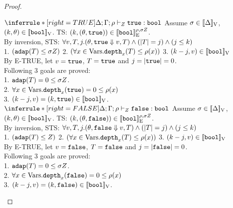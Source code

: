 \documentclass[a4paper,11pt]{article}
\theoremstyle{definition}
\begin{document}
\begin{proof}
\begin{mainitem}
\caseL
{
$
    \inferrule*[right = TRUE]{
    }{
      \Delta; \Gamma; \dmap \tvdash{\nnatA} \etrue: \tbool
    }
$
}
Assume $ \sigma \in [\![ \Delta ]\!]_{\text{V}}$, $ (k, \theta) \in [\![ \mathtt{bool} ]\!]_{\text{V}} $. TS: $(k, (\theta, \mathtt{true})) \in [\![ \mathtt{bool} ]\!]_{\text{E}}^{\rho, \sigma Z}$.\\
%
By inversion, STS: $\forall v, T, j. (\theta, \mathtt{true} \mathrel{\Downarrow} v, T) \land (|T| = j) \land (j \leq k) $\\
%
1. $ (\mathtt{adap}(T) \leq \sigma Z)$
%
2. $ (\forall x \in \mbox{Vars}. \mathtt{depth}_{x}(T) \leq \rho(x))$
%
3. $ (k - j, v) \in [\![ \mathtt{bool} ]\!]_{\text{V}}$\\
%
By E-TRUE, let $v = \mathtt{true}$, $T = \mathtt{true}$ and $j = |\mathtt{true}| = 0$.\\
%
Following 3 goals are proved:\\
%
1. $\mathtt{adap}(T) = 0 \leq \sigma Z$.\\
2. $\forall x \in \mbox{Vars}. \mathtt{depth}_{x}(\mathtt{true}) = 0 \leq \rho(x)$\\
3. $(k - j, v) = (k, \mathtt{true}) \in [\![ \mathtt{bool} ]\!]_{\text{V}}$.\\



\caseL
{
$
    \inferrule*[right = FALSE]{
    }{
      \Delta; \Gamma; \dmap \tvdash{\nnatA} \efalse: \tbool
    }
$
}
Assume $ \sigma \in [\![ \Delta ]\!]_{\text{V}}$, $ (k, \theta) \in [\![ \mathtt{bool} ]\!]_{\text{V}} $. TS: $(k, (\theta, \mathtt{false})) \in [\![ \mathtt{bool} ]\!]_{\text{E}}^{\rho, \sigma Z}$.\\
%
By inversion, STS: $\forall v, T, j. (\theta, \mathtt{false} \mathrel{\Downarrow} v, T) \land (|T| = j) \land (j \leq k) $\\
%
1. $ (\mathtt{adap}(T) \leq Z) $
%
2. $ (\forall x \in  \mbox{Vars}. \mathtt{depth}_{x}(T) \leq \rho(x))$
%
3. $(k - j, v) \in [\![ \mathtt{bool} ]\!]_{\text{V}}$\\
%
By E-TRUE, let $v = \mathtt{false}$, $T = \mathtt{false}$ and $j = |\mathtt{false}| = 0$.\\
%
Following 3 goals are proved:\\
%
1. $\mathtt{adap}(T) = 0 \leq \sigma Z$.\\
2. $\forall x \in \mbox{Vars}. \mathtt{depth}_{x}(\mathtt{false}) = 0 \leq \rho(x)$\\
3. $(k - j, v) = (k, \mathtt{false}) \in [\![ \mathtt{bool} ]\!]_{\text{V}}$.\\



\end{mainitem}
\end{proof}
\end{document}
